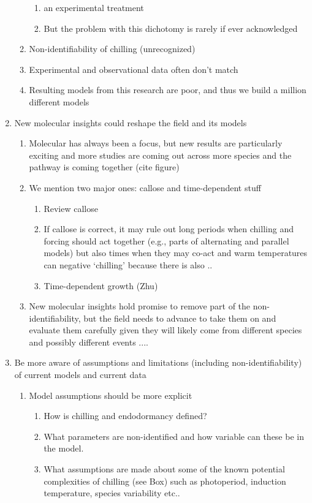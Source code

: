 \documentclass[11pt,letter]{article}
\begin{document}
\begin{enumerate}
\begin{enumerate}
\begin{enumerate}
\item an experimental treatment
\item But the problem with this dichotomy is rarely if ever acknowledged
\end{enumerate}
\item Non-identifiability of chilling (unrecognized)
\item Experimental and observational data often don't match
\item Resulting models from this research are poor, and thus we build a million different models
\end{enumerate}
\item New molecular insights could reshape the field and its models 
\begin{enumerate}
\item Molecular has always been a focus, but new results are particularly exciting and more studies are coming out across more species and the pathway is coming together (cite figure)
\item We mention two major ones: callose and time-dependent stuff
\begin{enumerate}
\item Review callose
\item If callose is correct, it may rule out long periods when chilling and forcing should act together (e.g., parts of alternating and parallel models) but also times when they may co-act and warm temperatures can negative `chilling' because there is also .. 
\item Time-dependent growth (Zhu)
\end{enumerate}
\item New molecular insights hold promise to remove part of the non-identifiability, but the field needs to advance to take them on and evaluate them carefully given they will likely come from different species and possibly different events ....
\end{enumerate}
\item Be more aware of assumptions and limitations (including non-identifiability) of current models and current data
\begin{enumerate}
\item Model assumptions should be more explicit
\begin{enumerate}
\item How is chilling and endodormancy defined? 
\item What parameters are non-identified and how variable can these be in the model.
\item What assumptions are made about some of the known potential complexities of chilling (see Box) such as photoperiod, induction temperature, species variability etc..

\end{enumerate}
\end{enumerate}
\end{enumerate}
\end{document}
